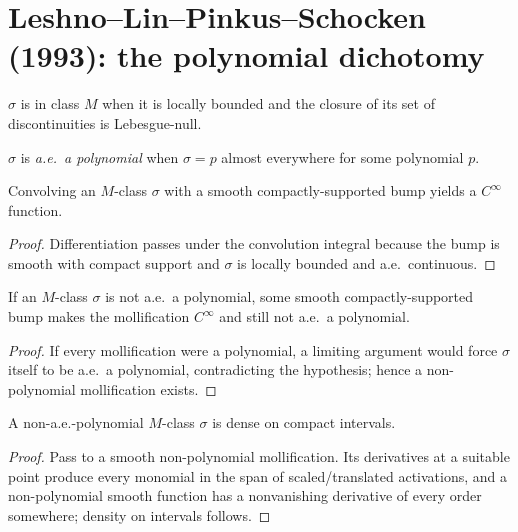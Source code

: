 \chapter{Leshno--Lin--Pinkus--Schocken (1993): the polynomial dichotomy}

\begin{definition}[Class $M$]\label{def:classM}
  \leanok
  $\sigma$ is in class $M$ when it is locally bounded and the closure of its set of
  discontinuities is Lebesgue-null.
\end{definition}

\begin{definition}[A.e.\ polynomial]\label{def:isaepoly}
  \leanok
  $\sigma$ is \emph{a.e.\ a polynomial} when $\sigma=p$ almost everywhere for some polynomial $p$.
\end{definition}

\begin{theorem}\label{thm:contdiff-mollify}
  \leanok
  Convolving an $M$-class $\sigma$ with a smooth compactly-supported bump yields a $C^\infty$
  function.
\end{theorem}
\begin{proof}\leanok
  Differentiation passes under the convolution integral because the bump is smooth with compact
  support and $\sigma$ is locally bounded and a.e.\ continuous.
\end{proof}

\begin{theorem}\label{thm:exists-nonpoly-mollify}
  \leanok
  If an $M$-class $\sigma$ is not a.e.\ a polynomial, some smooth compactly-supported bump makes
  the mollification $C^\infty$ and still not a.e.\ a polynomial.
\end{theorem}
\begin{proof}\leanok
  If every mollification were a polynomial, a limiting argument would force $\sigma$ itself to be
  a.e.\ a polynomial, contradicting the hypothesis; hence a non-polynomial mollification exists.
\end{proof}

\begin{theorem}\label{thm:univariate-density}
  \leanok
  A non-a.e.-polynomial $M$-class $\sigma$ is dense on compact intervals.
\end{theorem}
\begin{proof}\leanok
  Pass to a smooth non-polynomial mollification. Its derivatives at a suitable point produce every
  monomial in the span of scaled/translated activations, and a non-polynomial smooth function has
  a nonvanishing derivative of every order somewhere; density on intervals follows.
\end{proof}

